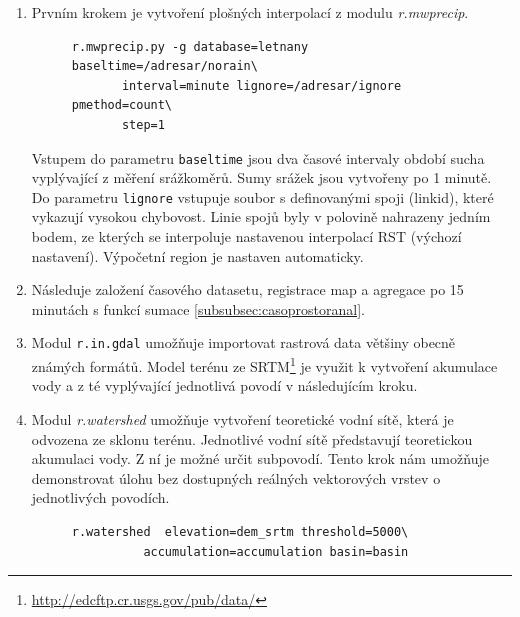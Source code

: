 \documentclass[a4paper,12pt,oneside]{report}
\begin{document}
\begin{enumerate}

\item Prvním krokem je vytvoření plošných interpolací z modulu
  \textit{r.mwprecip}.

\begin{figure}[h!]
\begin{footnotesize}
\lstset{extendedchars=false,
escapeinside=''}
\begin{lstlisting}[style=mybash]
r.mwprecip.py -g database=letnany baseltime=/adresar/norain\
       interval=minute lignore=/adresar/ignore pmethod=count\ 
       step=1 
\end{lstlisting}
\end{footnotesize} 
\end{figure}

Vstupem do parametru \texttt{baseltime} jsou dva časové intervaly
období sucha vyplývající z měření srážkoměrů. Sumy srážek jsou
vytvořeny po 1 minutě. Do parametru \texttt{lignore} vstupuje soubor s
definovanými spoji (linkid), které vykazují vysokou chybovost. Linie
spojů byly v polovině nahrazeny jedním bodem, ze kterých se
interpoluje nastavenou interpolací RST (výchozí nastavení). Výpočetní
region je nastaven automaticky.


\item Následuje založení časového datasetu, registrace map a agregace po 15 minutách s funkcí sumace \ref{subsubsec:casoprostoranal}.

\item Modul \texttt{r.in.gdal} umožňuje importovat rastrová data většiny obecně známých formátů.  Model terénu ze \ac{SRTM}\footnote{\url{http://edcftp.cr.usgs.gov/pub/data/}} je využit k vytvoření akumulace vody a z té vyplývající jednotlivá povodí v následujícím kroku.

\item Modul \textit{r.watershed } umožňuje vytvoření teoretické vodní
  sítě, která je odvozena ze sklonu terénu. Jednotlivé vodní sítě
  představují teoretickou akumulaci vody. Z ní je možné určit
  subpovodí. Tento krok nám umožňuje demonstrovat úlohu bez dostupných
  reálných vektorových vrstev o jednotlivých povodích.

\begin{figure}[h!]
\begin{footnotesize}
\lstset{extendedchars=false,
escapeinside=''}
\begin{lstlisting}[style=mybash]
r.watershed  elevation=dem_srtm threshold=5000\
          accumulation=accumulation basin=basin
\end{lstlisting}
\end{footnotesize} 
\end{figure}


\end{enumerate}
\end{document}
